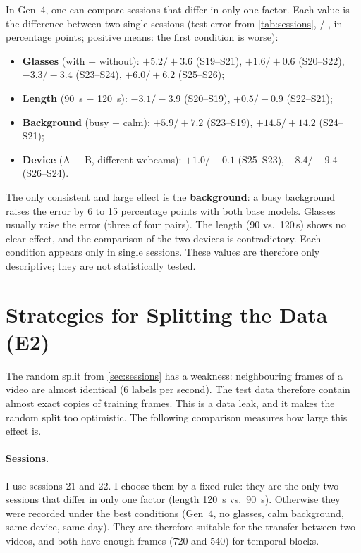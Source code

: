 In Gen~4, one can compare sessions that differ in only one factor. Each value is
the difference between two single sessions (test error from
\cref{tab:sessions},  / , in percentage
points; positive means: the first condition is worse):
\begin{itemize}[nosep]
  \item \textbf{Glasses} (with $-$ without): $+5.2/+3.6$ (S19--S21),
        $+1.6/+0.6$ (S20--S22), $-3.3/-3.4$ (S23--S24), $+6.0/+6.2$ (S25--S26);
  \item \textbf{Length} (\SI{90}{\second} $-$ \SI{120}{\second}):
        $-3.1/-3.9$ (S20--S19), $+0.5/-0.9$ (S22--S21);
  \item \textbf{Background} (busy $-$ calm): $+5.9/+7.2$ (S23--S19),
        $+14.5/+14.2$ (S24--S21);
  \item \textbf{Device} (A $-$ B, different webcams): $+1.0/+0.1$
        (S25--S23), $-8.4/-9.4$ (S26--S24).
\end{itemize}
The only consistent and large effect is the \textbf{background}: a busy
background raises the error by 6 to 15 percentage points with both base models.
Glasses usually raise the error (three of four pairs). The length (90 vs.\
120\,s) shows no clear effect, and the comparison of the two devices is
contradictory. Each condition appears only in single sessions. These values are
therefore only descriptive; they are not statistically tested.

\section{Strategies for Splitting the Data (E2)}
\label{sec:loading}

The random split from \cref{sec:sessions} has a weakness: neighbouring frames of
a video are almost identical (6 labels per second). The test data therefore
contain almost exact copies of training frames. This is a data leak, and it makes
the random split too optimistic. The following comparison measures how large
this effect is.

\paragraph{Sessions.} I use sessions 21 and 22. I choose them by a fixed rule:
they are the only two sessions that differ in only one factor (length
\SI{120}{\second} vs.\ \SI{90}{\second}). Otherwise they were recorded under the
best conditions (Gen~4, no glasses, calm background, same device, same day). They are
therefore suitable for the transfer between two videos, and both have enough
frames (720 and 540) for temporal blocks.

